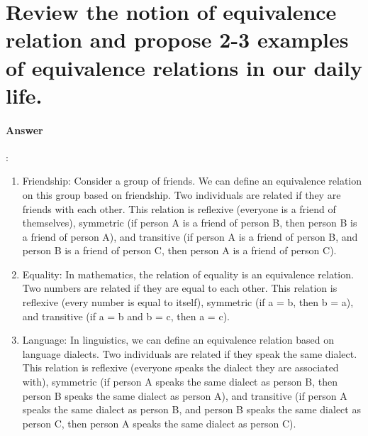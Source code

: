 \documentclass{article}
\begin{document}
\section{Review the notion of equivalence relation and propose 2-3 examples of equivalence relations in our daily life.}

\paragraph{Answer}:

\begin{enumerate}
  \item Friendship: Consider a group of friends. We can define an equivalence relation on this group based on friendship. Two individuals are related if they are friends with each other. This relation is reflexive (everyone is a friend of themselves), symmetric (if person A is a friend of person B, then person B is a friend of person A), and transitive (if person A is a friend of person B, and person B is a friend of person C, then person A is a friend of person C).
  \item Equality: In mathematics, the relation of equality is an equivalence relation. Two numbers are related if they are equal to each other. This relation is reflexive (every number is equal to itself), symmetric (if a = b, then b = a), and transitive (if a = b and b = c, then a = c).
  \item Language: In linguistics, we can define an equivalence relation based on language dialects. Two individuals are related if they speak the same dialect. This relation is reflexive (everyone speaks the dialect they are associated with), symmetric (if person A speaks the same dialect as person B, then person B speaks the same dialect as person A), and transitive (if person A speaks the same dialect as person B, and person B speaks the same dialect as person C, then person A speaks the same dialect as person C).
\end{enumerate}
\end{document}
